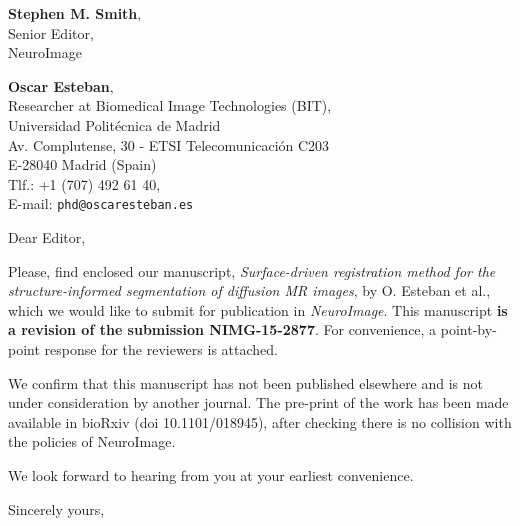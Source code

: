 \documentclass[11pt]{letter} %
\begin{document}

\begin{letter}{\textbf{Stephen M. Smith}, \\
Senior Editor, \\
NeuroImage
}




\begin{flushright}
\textbf{Oscar Esteban}, \\ %
Researcher at Biomedical Image Technologies (BIT), \\
Universidad Polit\'ecnica de Madrid \\
Av. Complutense, 30 - ETSI Telecomunicaci\'on C203 \\
E-28040 Madrid (Spain) \\
Tlf.: +1 (707) 492 61 40,\\
E-mail: \texttt{phd@oscaresteban.es} %
\end{flushright}
\vfill

\signature{Oscar Esteban} %


\opening{Dear Editor,}

Please, find enclosed our manuscript, \emph{Surface-driven registration method for the structure-informed segmentation
  of diffusion MR images}, by O. Esteban et al., which we would like to submit for publication in \emph{NeuroImage}.
This manuscript \textbf{is a revision of the submission NIMG-15-2877}.
For convenience, a point-by-point response for the reviewers is attached.

We confirm that this manuscript has not been published elsewhere and is not under consideration by another journal.
The pre-print of the work has been made available in bioRxiv (doi 10.1101/018945), after checking there
  is no collision with the policies of NeuroImage.

We look forward to hearing from you at your earliest convenience.

\closing{Sincerely yours,}



\vfill
\end{letter}
\end{document}
